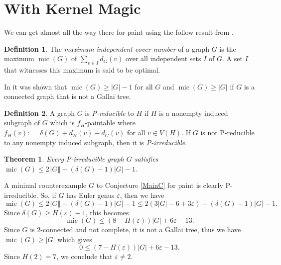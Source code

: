 \documentclass[12pt]{article}
\theoremstyle{plain}
\newtheorem{thm}{Theorem}[section]
\theoremstyle{definition}
\newtheorem{defn}{Definition}
\theoremstyle{remark}
\newcommand{\card}[1]{\left|#1\right|}
\newcommand{\size}[1]{\left\Vert#1\right\Vert}
\newcommand{\DefinedAs}{\mathrel{\mathop:}=}
\newcommand{\mic}{\operatorname{mic}}
\begin{document}
\section{With Kernel Magic}

We can get almost all the way there for paint using the follow result from \cite{OreVizing}.
\begin{defn} The \emph{maximum independent cover number }of a graph $G$
	is the maximum $\mic(G)$ of $\sum_{v\in I}d_{G}(v)$ over all independent sets $I$
	of $G$. A set $I$ that witnesses this maximum is said to be optimal. 
\end{defn}

In \cite{OreVizing} it was shown that $\mic(G) \ge |G| - 1$ for all $G$ and $\mic(G) \ge |G|$ if $G$ is a connected graph that is not a Gallai tree.

\begin{defn} A graph $G$ is \emph{P-reducible} to $H$ if $H$ is a nonempty induced
	subgraph of $G$ which is $f_{H}$-paintable where $f_{H}(v)\DefinedAs\delta(G)+d_{H}(v)-d_{G}(v)$
	for all $v\in V(H)$. If $G$ is not P-reducible to any nonempty induced subgraph,
	then it is \emph{P-irreducible}. \end{defn}

\begin{thm}\label{ConsantListMicStrength} Every P-irreducible graph $G$ satisfies
	$\mic(G)\leq2\size{G}-(\delta(G)-1)\card{G}-1$. 
\end{thm}

A minimal counterexample $G$ to Conjecture \ref{MainC} for paint is clearly P-irreducible.  So, if $G$ has Euler genus $\varepsilon$, then we have
\[\mic(G) \le 2\size{G}-(\delta(G)-1)\card{G}-1 \le 2(3\card{G} - 6 + 3\varepsilon) -(\delta(G)-1)\card{G}-1.\]
Since $\delta(G) \ge H(\varepsilon) - 1$, this becomes 
\[\mic(G) \le (8 - H(\varepsilon))\card{G} + 6\varepsilon - 13.\]
Since $G$ is $2$-connected and not complete, it is not a Gallai tree, thus we have $\mic(G) \ge |G|$ which gives
\[0 \le (7 - H(\varepsilon))\card{G} + 6\varepsilon - 13.\]
Since $H(2) = 7$, we conclude that $\varepsilon \ne 2$.



\end{document}
